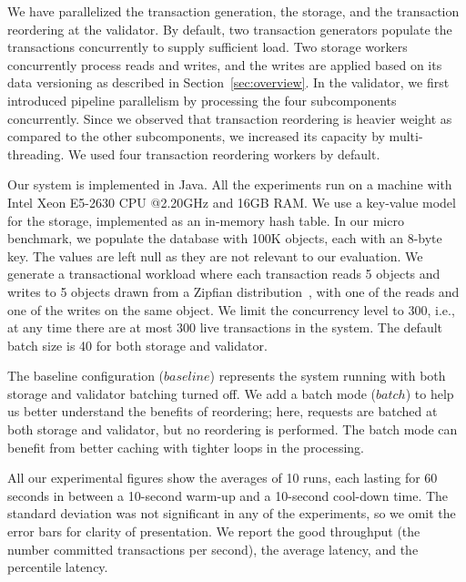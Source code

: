 We have parallelized the transaction generation, the storage, and the transaction reordering at the validator. By default, two transaction generators populate the transactions concurrently to supply sufficient load. Two storage workers concurrently process reads and writes, and the writes are applied based on its data versioning as described in Section~\ref{sec:overview}. In the validator, we first introduced pipeline parallelism by processing the four subcomponents concurrently. Since we observed that transaction reordering is heavier weight as compared to the other subcomponents, we increased its capacity by multi-threading. We used four transaction reordering workers by default.

Our system is implemented in Java. All the experiments run on a machine with
Intel Xeon E5-2630 CPU @2.20GHz and 16GB RAM. We use a key-value model for the
storage, implemented as an in-memory hash table. In our micro benchmark, we populate the database with 100K objects, each with an 8-byte key. The values are left null as they are not relevant to our evaluation. We generate a transactional workload where each transaction reads 5 objects and writes to 5 objects drawn from a Zipfian distribution~\cite{gray1994quickly}, with one of the reads and one of the writes on the same object. We limit the concurrency level to 300, i.e., at any time there are at most 300 live transactions in the system. The default batch size is 40 for both storage and validator.

The baseline configuration ($baseline$) represents the system running with both
storage and validator batching turned off. We add a batch mode ($batch$) to
help us better understand the benefits of reordering; here, requests are batched at both storage and validator, but no reordering is performed. The batch mode can benefit from better caching with tighter loops in the processing. 


All our experimental figures show the averages of 10 runs, each lasting for 60 seconds in between a 10-second warm-up and a 10-second cool-down time. The standard deviation was not significant in any of the experiments, so we omit the error bars for clarity of presentation. We report the good throughput (the number committed transactions per second), the average latency, and the percentile latency.


